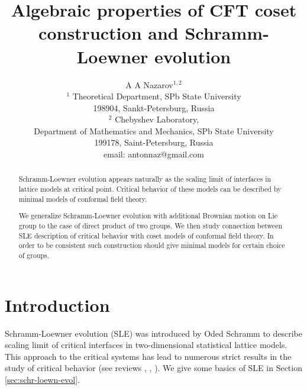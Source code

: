 \documentclass[12pt]{article}
\theoremstyle{definition}
\theoremstyle{definition} \newtheorem{Def}{Definition}
\begin{document}
\title{Algebraic properties of CFT coset construction and Schramm-Loewner evolution}
\author{A A Nazarov$^{1,2}$\\
  {\small $^1$ Theoretical Department, SPb State University}\\
  {\small 198904, Sankt-Petersburg, Russia}\\
  {\small$^{2}$ Chebyshev Laboratory,}\\
  {\small Department of Mathematics and Mechanics, SPb State University}\\
  {\small 199178, Saint-Petersburg, Russia}\\
  {\small email: antonnaz@gmail.com}}

\maketitle

\begin{abstract}
  Schramm-Loewner evolution appears naturally as the scaling limit of interfaces in lattice models at critical point. Critical behavior of these models can be described by minimal models of conformal field theory.

  We generalize Schramm-Loewner evolution with additional Brownian motion on Lie group to the case of direct product of two groups. We then study connection between SLE description of critical behavior with coset models of conformal field theory. In order to be consistent such construction should give minimal models for certain choice of groups. 

\end{abstract}

\section{Introduction}
Schramm-Loewner evolution (SLE) was introduced by Oded Schramm  \cite{schramm2000scaling} to describe scaling limit of critical interfaces in two-dimensional statistical lattice models. This approach to the critical systems has lead to numerous strict results in the study of critical behavior (see reviews  \cite{rohde2005basic}, \cite{bauer20062d}, \cite{Cardy:2005kh}). We give some basics of SLE in Section \ref{sec:schr-loewn-evol}.  
\end{document}
